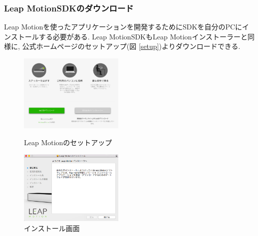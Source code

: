 \documentclass{funthesis}
\begin{document}
\subsubsection{Leap MotionSDKのダウンロード}
Leap Motionを使ったアプリケーションを開発するためにSDKを自分のPCにインストールする必要がある. Leap MotionSDKもLeap Motionインストーラーと同様に, 公式ホームページのセットアップ(図 \ref{setup})よりダウンロードできる. 


\begin{figure}[H]
 \begin{minipage}{0.5\hsize}
  \begin{center}
  \includegraphics[width=50mm]{./img/setup.png}
  \end{center}
  \caption{Leap Motionのセットアップ}
  \label{setup}
 \end{minipage}
 \begin{minipage}{0.5\hsize}
  \begin{center}
  \includegraphics[width=50mm]{./img/installer.png}
  \end{center}
  \caption{インストール画面}
  \label{install}
  \end{minipage}
\end{figure}
\end{document}
